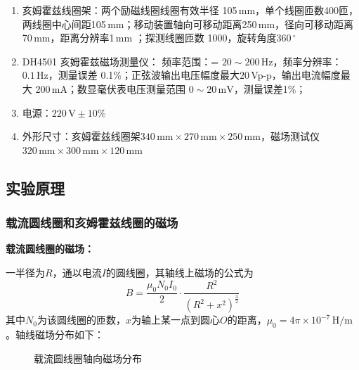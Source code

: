 \documentclass[UTF8]{article}
\theoremstyle{MyLineTheoremStyle} %
\theoremstyle{MyBlockTheoremStyle} %
\theoremstyle{MySubsubsectionStyle} %
\begin{document}
\begin{enumerate}
\item 亥姆霍兹线圈架：两个励磁线圈线圈有效半径 105\,mm，单个线圈匝数400匝，两线圈中心间距105\,mm；移动装置轴向可移动距离250\,mm，径向可移动距离70\,mm，距离分辨率1\,mm ；探测线圈匝数 1000，旋转角度$ 360\,^\circ $
\item DH4501 亥姆霍兹磁场测量仪： 频率范围：= $ 20\sim 200\,\mathrm{Hz} $，频率分辨率：$ 0.1\,\mathrm{Hz} $，测量误差 0.1\%；正弦波输出电压幅度最大$ 20\, $Vp-p，输出电流幅度最大 200\,mA；数显毫伏表电压测量范围 $ 0\sim 20\,\mathrm{mV} $，测量误差1\%；
\item 电源：$ 220\,\mathrm V\pm 10\% $
\item 外形尺寸：亥姆霍兹线圈架$ 340\,\mathrm{mm}\times270\,\mathrm{mm}\times250\,\mathrm{mm} $，磁场测试仪$ 320\,\mathrm{mm}\times300\,\mathrm{mm}\times120\,\mathrm{mm} $
\end{enumerate}


\subsection{实验原理}
\subsubsection{载流圆线圈和亥姆霍兹线圈的磁场}

\noindent \textbf{载流圆线圈的磁场：}\par
一半径为$ R $，通以电流$ I $的圆线圈，其轴线上磁场的公式为
\begin{equation}
B = \frac{\mu_0 N_0 I_0}{2}\cdot \frac{R^2}{\left(R^2 + x^2\right)^{\frac{3}{2}}}
\end{equation}
其中$ N_0 $为该圆线圈的匝数，$ x $为轴上某一点到圆心$ O $的距离，$ \mu_0=4\pi\times10^{-7}\,\mathrm{H/m} $。轴线磁场分布如下：

\begin{figure}[H]
    \centering
    \caption{载流圆线圈轴向磁场分布}
\end{figure}
\end{document}
